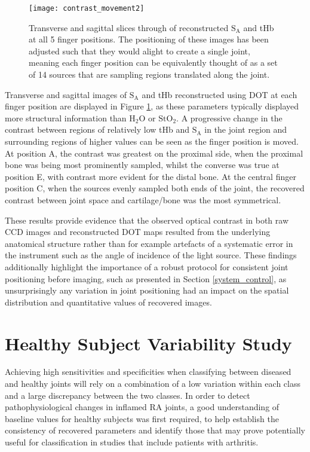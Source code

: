 \documentclass[twoside]{bhamthesis}
\theoremstyle{definition}
\begin{document}
\begin{figure}[!ht]
\centering\texttt{[image: contrast\_movement2]}
\caption{Transverse and sagittal slices through of reconstructed $\mathrm{S_A}$ and tHb at all 5 finger positions. The positioning of these images has been adjusted such that they would alight to create a single joint, meaning each finger position can be equivalently thought of as a set of 14 sources that are sampling regions translated along the joint. }
\label{movement_recon}
\end{figure}

Transverse and sagittal images of $\mathrm{S_A}$ and tHb reconstructed using DOT at each finger position are displayed in Figure 
\ref{movement_recon}, as these parameters typically displayed more structural information than $\mathrm{H_2O}$ or $\mathrm{StO_2}$. A progressive change in the contrast between regions of relatively low tHb and $\mathrm{S_A}$ in the joint region and surrounding regions of higher values can be seen as the finger position is moved. At position A, the contrast was greatest on the proximal side, when the proximal bone was being most prominently sampled, whilst the converse was true at position E, with contrast more evident for the distal bone. At the central finger position C, when the sources evenly sampled both ends of the joint, the recovered contrast between joint space and cartilage/bone was the most symmetrical.

These results provide evidence that the observed optical contrast in both raw CCD images and reconstructed DOT maps resulted from the underlying anatomical structure rather than for example artefacts of a systematic error in the instrument such as the angle of incidence of the light source. These findings additionally highlight the importance of a robust protocol for consistent joint positioning before imaging, such as presented in Section \ref{system_control}, as unsurprisingly any variation in joint positioning had an impact on the spatial distribution and quantitative values of recovered images.

\section{Healthy Subject Variability Study}
\label{Healthy_design}
Achieving high sensitivities and specificities when classifying between diseased and healthy joints will rely on a combination of a low variation within each class and a large discrepancy between the two classes. In order to detect pathophysiological changes in inflamed RA joints, a good understanding of baseline values for healthy subjects was first required, to help establish the consistency of recovered parameters and identify those that may prove potentially useful for classification in studies that include patients with arthritis.
\end{document}
